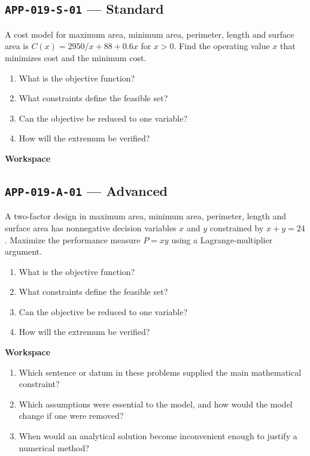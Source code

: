 \documentclass[11pt]{book}
\newcommand{\pid}[1]{\texttt{#1}}
\newcommand{\workspace}{\par\vspace{0.7in}\hrulefill\par\vspace{0.55in}\hrulefill\par}
\begin{document}
\subsection*{\pid{APP-019-S-01} — Standard}
\begin{problembox}
A cost model for maximum area, minimum area, perimeter, length and surface area is $C(x)=2950/x+88+0.6x$ for $x>0$. Find the operating value $x$ that minimizes cost and the minimum cost.
\end{problembox}
\begin{promptbox}\begin{enumerate}
\item What is the objective function?
\item What constraints define the feasible set?
\item Can the objective be reduced to one variable?
\item How will the extremum be verified?
\end{enumerate}\end{promptbox}
\textbf{Workspace}\workspace
{}
\subsection*{\pid{APP-019-A-01} — Advanced}
\begin{problembox}
A two-factor design in maximum area, minimum area, perimeter, length and surface area has nonnegative decision variables $x$ and $y$ constrained by $x+y=24$. Maximize the performance measure $P=xy$ using a Lagrange-multiplier argument.
\end{problembox}
\begin{promptbox}\begin{enumerate}
\item What is the objective function?
\item What constraints define the feasible set?
\item Can the objective be reduced to one variable?
\item How will the extremum be verified?
\end{enumerate}\end{promptbox}
\textbf{Workspace}\workspace
\begin{reflectionbox}\begin{enumerate}
\item Which sentence or datum in these problems supplied the main mathematical constraint?
\item Which assumptions were essential to the model, and how would the model change if one were removed?
\item When would an analytical solution become inconvenient enough to justify a numerical method?
\end{enumerate}\end{reflectionbox}
\end{document}
